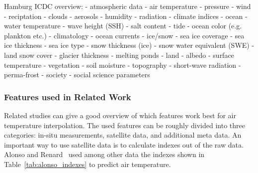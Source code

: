 Hamburg ICDC overview:
- atmospheric data
    - air temperature
    - pressure
    - wind
    - reciptation
    - clouds
    - aerosols
    - humidity
    - radiation
    - climate indices
- ocean
    - water temperature
    - wave height (SSH)
    - salt content
    - tide
    - ocean color (e.g. plankton etc.)
    - climatology
    - ocean currents
- ice/snow
    - sea ice coverage
    - sea ice thickness
    - sea ice type
    - snow thickness (ice)
    - snow water equivalent (SWE)
    - land snow cover
    - glacier thickness
    - melting ponds
- land
    - albedo
    - surface temperature
    - vegetation
    - soil moisture
    - topography
    - short-wave radiation
    - perma-frost
- society
    - social science parameters

\subsubsection{Features used in Related Work}

Related studies can give a good overview of which features work best for air temperature interpolation. The used features can be roughly divided into three categories: in-situ measurements, satellite data, and additional meta data.
An important way to use satellite data is to calculate indexes out of the raw data. Alonso and Renard~\cite{alonso2020new} used among other data the indexes shown in Table~\ref{tab:alonso_indexes} to predict air temperature.

